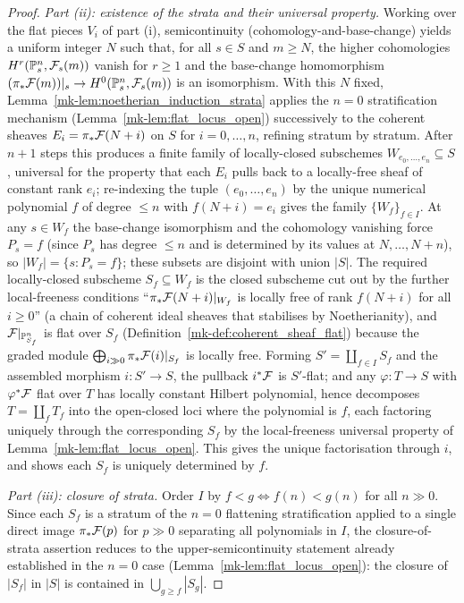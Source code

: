 \begin{proof}
  \emph{Part (ii): existence of the strata and their universal property.}
  Working over the flat pieces \(V_i\) of part (i), semicontinuity
  (cohomology-and-base-change) yields a uniform integer \(N\) such that, for all
  \(s \in S\) and \(m \ge N\), the higher cohomologies \(H^r(\mathbb{P}^n_s, \mathcal{F}_s(m))\)
  vanish for \(r \ge 1\) and the base-change homomorphism
  \((\pi_* \mathcal{F}(m))|_s \to H^0(\mathbb{P}^n_s, \mathcal{F}_s(m))\) is an isomorphism.  With this
  \(N\) fixed, Lemma~\ref{mk-lem:noetherian_induction_strata} applies the \(n = 0\)
  stratification mechanism (Lemma~\ref{mk-lem:flat_locus_open}) successively to the
  coherent sheaves \(E_i = \pi_* \mathcal{F}(N+i)\) on \(S\) for \(i = 0, \dots, n\),
  refining stratum by stratum.  After \(n+1\) steps this produces a finite
  family of locally-closed subschemes \(W_{e_0, \dots, e_n} \subseteq S\),
  universal for the property that each \(E_i\) pulls back to a locally-free sheaf
  of constant rank \(e_i\); re-indexing the tuple \((e_0, \dots, e_n)\) by the
  unique numerical polynomial \(f\) of degree \(\le n\) with \(f(N+i) = e_i\)
  gives the family \(\{W_f\}_{f \in I}\).  At any \(s \in W_f\) the base-change
  isomorphism and the cohomology vanishing force \(P_s = f\) (since \(P_s\) has
  degree \(\le n\) and is determined by its values at \(N, \dots, N+n\)), so
  \(|W_f| = \{s : P_s = f\}\); these subsets are disjoint with union \(|S|\).
  The required locally-closed subscheme \(S_f \subseteq W_f\) is the closed
  subscheme cut out by the further local-freeness conditions
  ``\(\pi_* \mathcal{F}(N+i)|_{W_f}\) is locally free of rank \(f(N+i)\) for all
  \(i \ge 0\)'' (a chain of coherent ideal sheaves that stabilises by
  Noetherianity), and \(\mathcal{F}|_{\mathbb{P}^n_{S_f}}\) is flat over \(S_f\)
  (Definition~\ref{mk-def:coherent_sheaf_flat}) because the graded module
  \(\bigoplus_{i \gg 0} \pi_* \mathcal{F}(i)|_{S_f}\) is locally free.  Forming
  \(S' = \coprod_{f \in I} S_f\) and the assembled morphism \(i : S' \to S\),
  the pullback \(i^* \mathcal{F}\) is \(S'\)-flat; and any \(\varphi : T \to S\) with
  \(\varphi^* \mathcal{F}\) flat over \(T\) has locally constant Hilbert polynomial, hence
  decomposes \(T = \coprod_f T_f\) into the open-closed loci where the polynomial
  is \(f\), each factoring uniquely through the corresponding \(S_f\) by the
  local-freeness universal property of Lemma~\ref{mk-lem:flat_locus_open}.  This
  gives the unique factorisation through \(i\), and shows each \(S_f\) is
  uniquely determined by \(f\).

  \emph{Part (iii): closure of strata.}
  Order \(I\) by \(f < g \iff f(n) < g(n)\) for all \(n \gg 0\).  Since each
  \(S_f\) is a stratum of the \(n = 0\) flattening stratification applied to a
  single direct image \(\pi_* \mathcal{F}(p)\) for \(p \gg 0\) separating all polynomials
  in \(I\), the closure-of-strata assertion reduces to the upper-semicontinuity
  statement already established in the \(n = 0\) case
  (Lemma~\ref{mk-lem:flat_locus_open}): the closure of \(|S_f|\) in \(|S|\) is
  contained in \(\bigcup_{g \ge f} |S_g|\).
\end{proof}

